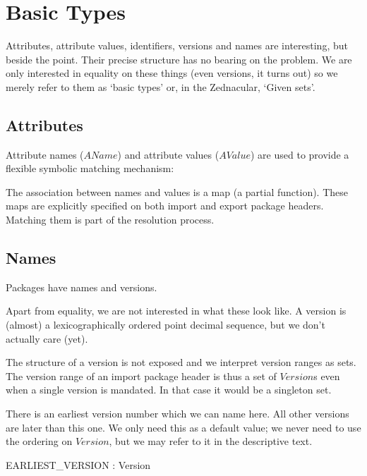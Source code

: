 \documentclass[a4paper,12pt]{article}
\begin{document}

\clearpage
\section{Basic Types}
\label{cha:basics}

Attributes, attribute values, identifiers, versions and names are interesting, but beside the point. Their precise structure has no bearing on the problem. We are only interested in equality on these things (even versions, it turns out) so we merely refer to them as `basic types'  or, in the Zednacular, `Given sets'.

\subsection{Attributes}
Attribute names ($AName$) and attribute values ($AValue$) are used to provide a flexible symbolic matching mechanism:

\begin{zed}
\end{zed}
The association between names and values is a map (a partial function). These maps are explicitly specified on both import and export package headers. Matching them is part of the resolution process.

\subsection{Names}
Packages have names and versions.
\begin{zed}
\end{zed}
Apart from equality, we are not interested in what these look like.
A version is (almost) a lexicographically ordered point decimal sequence, but we don't actually care (yet).

The structure of a version is not exposed and we interpret version ranges as sets. The version range of an import package header is thus a set of $Version$s even when a single version is mandated. In that case it would be a singleton set.

There is an earliest version number which we can name here. All other versions are later than this one. We only need this as a default value; we never need to use the ordering on $Version$, but we may refer to it in the descriptive text.
\begin{axdef}
 	EARLIEST\_VERSION : Version
\end{axdef}
\end{document}
